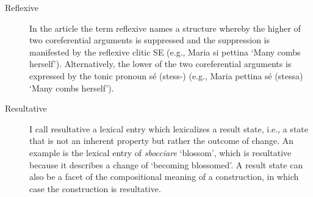 \documentclass[output=paper,colorlinks,citecolor=brown
]{langscibook}
\begin{document}
\begin{description}
\item[Reflexive] In the article the term reflexive names a structure whereby the higher of two coreferential arguments is suppressed and the suppression is manifested by the reflexive clitic SE (e.g., Maria si pettina ‘Many combs herself’). Alternatively, the lower of the two coreferential arguments is expressed by the tonic pronoun sé (stess-) (e.g., Maria pettina sé (stessa) ‘Many combs herself’).
\item[Resultative] I call resultative a   lexical entry which lexicalizes a result state, i.e., a state that is not an   inherent property but rather the outcome of change. An example is the lexical   entry of \textit{sbocciare} ‘blossom’, which is resultative because it   describes a change of ‘becoming blossomed’. A result state can also be a facet   of the compositional meaning of a construction, in which case the   construction is resultative.
\end{description}



\label{bentley:appendix:B}
\end{document}
